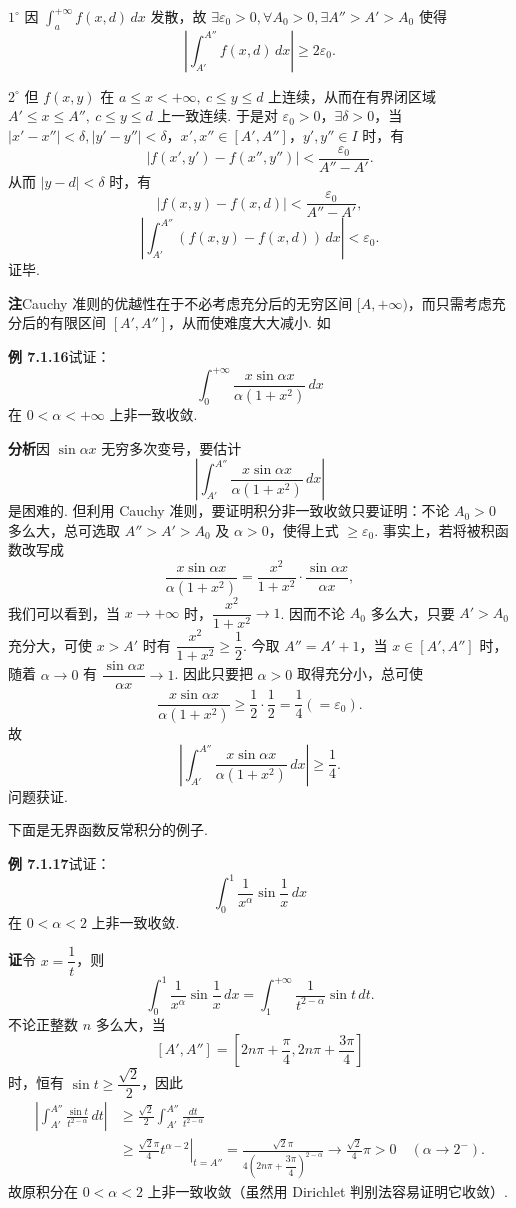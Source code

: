 \documentclass[UTF8, 12pt, fontset=fandol, oneside]{ctexart}
\begin{document}
$1^\circ$ 因 $\displaystyle\int_a^{+\infty}f(x,d)\,dx$ 发散，故 $\exists\varepsilon_0>0,\forall A_0>0,\exists A''>A'>A_0$ 使得
\[
\left|\int_{A'}^{A''}f(x,d)\,dx\right|\ge2\varepsilon_0.
\]

$2^\circ$ 但 $f(x,y)$ 在 $a\le x<+\infty,\ c\le y\le d$ 上连续，从而在有界闭区域 $A'\le x\le A'',\ c\le y\le d$ 上一致连续. 于是对 $\varepsilon_0>0$，$\exists\delta>0$，当 $|x'-x''|<\delta, |y'-y''|<\delta$，$x',x''\in[A',A'']$，$y',y''\in I$ 时，有
\[
|f(x',y')-f(x'',y'')|<\frac{\varepsilon_0}{A''-A'}.
\]
从而 $|y-d|<\delta$ 时，有
\[
|f(x,y)-f(x,d)|<\frac{\varepsilon_0}{A''-A'},
\]
\[
\left|\int_{A'}^{A''}(f(x,y)-f(x,d))\,dx\right|<\varepsilon_0.
\]
证毕.

\noindent\textbf{注}\quad Cauchy 准则的优越性在于不必考虑充分后的无穷区间 $[A,+\infty)$，而只需考虑充分后的有限区间 $[A',A'']$，从而使难度大大减小. 如

\noindent\textbf{例 7.1.16}\quad 试证：
\[
\int_0^{+\infty}\frac{x\sin\alpha x}{\alpha(1+x^2)}\,dx
\]
在 $0<\alpha<+\infty$ 上非一致收敛.

\noindent\textbf{分析}\quad 因 $\sin\alpha x$ 无穷多次变号，要估计
\[
\left|\int_{A'}^{A''}\frac{x\sin\alpha x}{\alpha(1+x^2)}\,dx\right|
\]
是困难的. 但利用 Cauchy 准则，要证明积分非一致收敛只要证明：不论 $A_0>0$ 多么大，总可选取 $A''>A'>A_0$ 及 $\alpha>0$，使得上式 $\ge\varepsilon_0$. 事实上，若将被积函数改写成
\[
\frac{x\sin\alpha x}{\alpha(1+x^2)}
=\frac{x^2}{1+x^2}\cdot\frac{\sin\alpha x}{\alpha x},
\]
我们可以看到，当 $x\to+\infty$ 时，$\dfrac{x^2}{1+x^2}\to1$. 因而不论 $A_0$ 多么大，只要 $A'>A_0$ 充分大，可使 $x>A'$ 时有 $\dfrac{x^2}{1+x^2}\ge\dfrac12$. 今取 $A''=A'+1$，当 $x\in[A',A'']$ 时，随着 $\alpha\to0$ 有 $\dfrac{\sin\alpha x}{\alpha x}\to1$. 因此只要把 $\alpha>0$ 取得充分小，总可使
\[
\frac{x\sin\alpha x}{\alpha(1+x^2)}
\ge\frac12\cdot\frac12=\frac14(=\varepsilon_0).
\]
故
\[
\left|\int_{A'}^{A''}\frac{x\sin\alpha x}{\alpha(1+x^2)}\,dx\right|\ge\frac14.
\]
问题获证.

下面是无界函数反常积分的例子.

\noindent\textbf{例 7.1.17}\quad 试证：
\[
\int_0^1\frac1{x^\alpha}\sin\frac1x\,dx
\]
在 $0<\alpha<2$ 上非一致收敛.

\noindent\textbf{证}\quad 令 $x=\dfrac1t$，则
\[
\int_0^1\frac1{x^\alpha}\sin\frac1x\,dx
=\int_1^{+\infty}\frac1{t^{2-\alpha}}\sin t\,dt.
\]
不论正整数 $n$ 多么大，当
\[
[A',A'']=\left[2n\pi+\frac\pi4,2n\pi+\frac{3\pi}4\right]
\]
时，恒有 $\sin t\ge\dfrac{\sqrt2}{2}$，因此
\[
\begin{aligned}
\left|\int_{A'}^{A''}\frac{\sin t}{t^{2-\alpha}}\,dt\right|
&\ge\frac{\sqrt2}{2}\int_{A'}^{A''}\frac{dt}{t^{2-\alpha}}\\
&\ge\left.\frac{\sqrt2\pi}{4}t^{\alpha-2}\right|_{t=A''}
=\frac{\sqrt2\pi}{4\left(2n\pi+\dfrac{3\pi}{4}\right)^{2-\alpha}}
\to\frac{\sqrt2}{4}\pi>0
\quad(\alpha\to2^-).
\end{aligned}
\]
故原积分在 $0<\alpha<2$ 上非一致收敛（虽然用 Dirichlet 判别法容易证明它收敛）.
\end{document}
